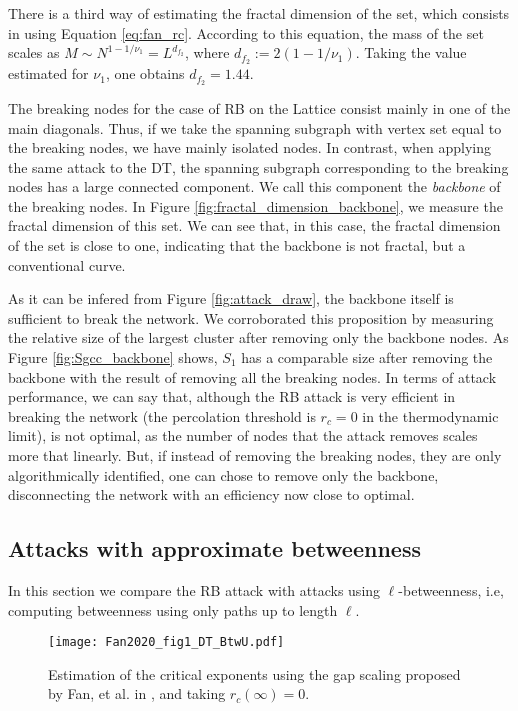 \documentclass{article}
\begin{document}
There is a third way of estimating the fractal dimension of the set, which consists in using Equation \ref{eq:fan_rc}. According to this equation, the mass of the set scales as $M\sim N^{1-1/\nu_1} = L^{d_{f_2}}$, where $d_{f_2} := 2(1-1/\nu_1)$. Taking the value estimated for $\nu_1$, one obtains $d_{f_2} = 1.44$.

The breaking nodes for the case of RB on the Lattice consist mainly in one of the main diagonals. Thus, if we take the spanning subgraph with vertex set equal to the breaking nodes, we have mainly isolated nodes. In contrast, when applying the same attack to the DT, the spanning subgraph corresponding to the breaking nodes has a large connected component. We call this component the \emph{backbone} of the breaking nodes. In Figure \ref{fig:fractal_dimension_backbone}, we measure the fractal dimension of this set. We can see that, in this case, the fractal dimension of the set is close to one, indicating that the backbone is not fractal, but a conventional curve. 

As it can be infered from Figure \ref{fig:attack_draw}, the backbone itself is sufficient to break the network. We corroborated this proposition by measuring the relative size of the largest cluster after removing only the backbone nodes. As Figure \ref{fig:Sgcc_backbone} shows, $S_1$ has a comparable size after removing the backbone with the result of removing all the breaking nodes. 
In terms of attack performance, we can say that, although the RB attack is very efficient in breaking the network (the percolation threshold is $r_c = 0$ in the thermodynamic limit), is not optimal, as the number of nodes that the attack removes scales more that linearly. But, if instead of removing the breaking nodes, they are only algorithmically identified, one can chose to remove only the backbone, disconnecting the network with an efficiency now close to optimal.

\subsection{Attacks with approximate betweenness}

In this section we compare the RB attack with attacks using $\ell$-betweenness, i.e, computing betweenness using only paths up to length $\ell$. 

\begin{figure}
\centering
\texttt{[image: Fan2020\_fig1\_DT\_BtwU.pdf]}
\caption{\label{fig:gap_exponents} Estimation of the critical exponents using the gap scaling proposed by Fan, et al. in \cite{Fan2020}, and taking $r_c(\infty) = 0$. }
\end{figure}
\end{document}
